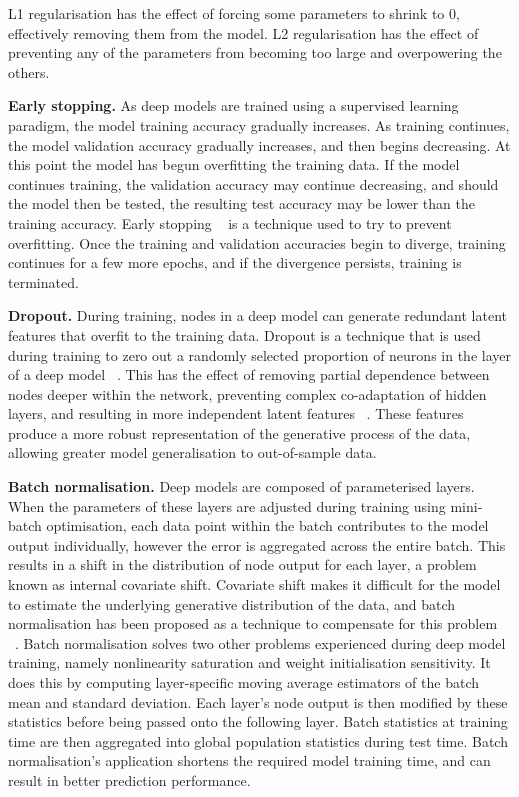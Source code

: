\noindent L1 regularisation has the effect of forcing some parameters to shrink to 0, effectively removing them from the model. L2 regularisation has the effect of preventing any of the parameters from becoming too large and overpowering the others. \par

\noindent \textbf{Early stopping.} As deep models are trained using a supervised learning paradigm, the model training accuracy gradually increases. As training continues, the model validation accuracy gradually increases, and then begins decreasing. At this point the model has begun overfitting the training data. If the model continues training, the validation accuracy may continue decreasing, and should the model then be tested, the resulting test accuracy may be lower than the training accuracy. Early stopping \unskip ~\citep{prechelt1998early} is a technique used to try to prevent overfitting. Once the training and validation accuracies begin to diverge, training continues for a few more epochs, and if the divergence persists, training is terminated. \par

\noindent \textbf{Dropout.} During training, nodes in a deep model can generate redundant latent features that overfit to the training data. Dropout is a technique that is used during training to zero out a randomly selected proportion of neurons in the layer of a deep model \unskip ~\citep{srivastava2014dropout}. This has the effect of removing partial dependence between nodes deeper within the network, preventing complex co-adaptation of hidden layers, and resulting in more independent latent features \unskip ~\citep{hinton2012improving}. These features produce a more robust representation of the generative process of the data, allowing greater model generalisation to out-of-sample data. \par

\noindent \textbf{Batch normalisation.} Deep models are composed of parameterised layers. When the parameters of these layers are adjusted during training using mini-batch optimisation, each data point within the batch contributes to the model output individually, however the error is aggregated across the entire batch. This results in a shift in the distribution of node output for each layer, a problem known as internal covariate shift. Covariate shift makes it difficult for the model to estimate the underlying generative distribution of the data, and batch normalisation has been proposed as a technique to compensate for this problem \unskip ~\citep{ioffe2015batch}. \newline
Batch normalisation solves two other problems experienced during deep model training, namely nonlinearity saturation and weight initialisation sensitivity. It does this by computing layer-specific moving average estimators of the batch mean and standard deviation. Each layer's node output is then modified by these statistics before being passed onto the following layer. Batch statistics at training time are then aggregated into global population statistics during test time. Batch normalisation's application shortens the required model training time, and can result in better prediction performance. 


